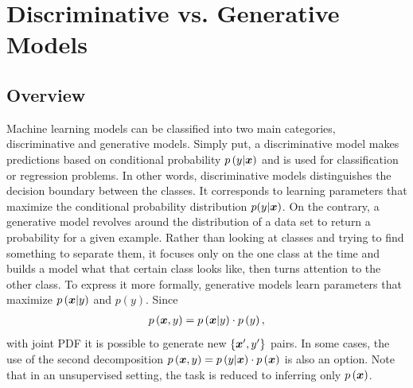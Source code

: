 
\chapter{Discriminative vs. Generative Models}\label{discriminative_modelinmg}
\section{Overview}
Machine learning models can be classified into two main categories, discriminative and generative models. Simply put, a discriminative model makes predictions based on conditional probability $p\left(y|\boldsymbol{x}\right)$ and is used for classification or regression problems. In other words, discriminative models distinguishes the decision boundary between the
classes.  It corresponds to learning parameters that maximize the conditional probability
distribution $p(y|\boldsymbol{x})$. On the contrary, a generative model revolves around the distribution of a data set to return a probability for a given example. Rather than
looking at classes and trying to find something to separate them, it focuses
only on the one class at the time and builds a model what that certain class looks like, then turns attention to the other class. To express it more formally, generative models learn parameters that maximize $p\left(\boldsymbol{x}|y \right)$ and $p\left(y\right)$. Since
\begin{align}\label{eq:prob_decompostion}
p\left(\boldsymbol{x},y\right) = p\left(\boldsymbol{x}|y\right)\cdot p\left(y\right),
\end{align}
with joint PDF it is possible to generate new $\left\lbrace\boldsymbol{x}',y'\right\rbrace$ pairs. In some cases, the use of the second decomposition $p\left(\boldsymbol{x},y\right) = p\left(y|\boldsymbol{x}\right)\cdot p\left(\boldsymbol{x}\right)$ is also an option.  Note that in an unsupervised setting, the task is reduced to inferring only $p\left(\boldsymbol{x}\right)$.
